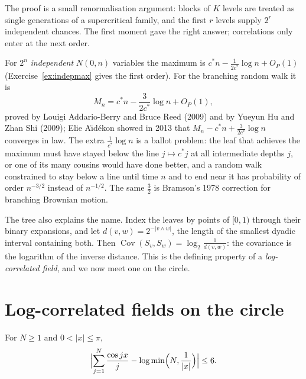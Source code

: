 The proof is a small renormalisation argument: blocks of $K$ levels are treated as single generations of a supercritical family, and the first $r$ levels supply $2^r$ independent chances. The first moment gave the right
answer; correlations only enter at the next order.

\begin{remark}
For $2^n$ \emph{independent} $N(0,n)$ variables the maximum is $c^*n-\frac1{2c^*}\log n+O_P(1)$ (Exercise~\ref{ex:indepmax} gives the first order). For the branching random walk it is
\[
M_n=c^*n-\frac3{2c^*}\log n+O_P(1),
\]
proved by Louigi Addario-Berry and Bruce Reed (2009) and by Yueyun Hu and Zhan Shi (2009); Elie A\"\i d\'ekon showed in 2013 that $M_n-c^*n+\frac3{2c^*}\log n$ converges in law. The extra $\frac1{c^*}\log n$ is a ballot problem: the leaf
that achieves the maximum must have stayed below the line $j\mapsto c^*j$ at all intermediate depths $j$, or one of its many cousins would have done better, and a random walk constrained to stay below a line until time $n$ and
to end near it has probability of order $n^{-3/2}$ instead of $n^{-1/2}$. The same $\frac32$ is Bramson's 1978 correction for branching Brownian motion.
\end{remark}

The tree also explains the name. Index the leaves by points of $[0,1)$ through their binary expansions, and let $d(v,w)=2^{-|v\wedge w|}$, the length of the smallest dyadic interval containing both. Then
$\operatorname{Cov}(S_v,S_w)=\log_2\frac1{d(v,w)}$: the covariance is the logarithm of the inverse distance. This is the defining property of a \emph{log-correlated field}, and we now meet one on the circle.

\section{Log-correlated fields on the circle}

\begin{lemma}\label{lem:cosine}
For $N\ge1$ and $0<|x|\le\pi$,
\[
\Bigl|\sum_{j=1}^N\frac{\cos jx}j-\log\min\Bigl(N,\frac1{|x|}\Bigr)\Bigr|\le6 .
\]
\end{lemma}

